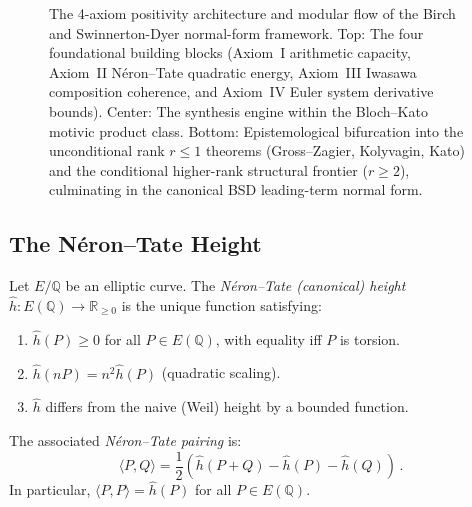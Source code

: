 \documentclass[aps,prd,twocolumn,superscriptaddress,nofootinbib,floatfix]{revtex4-2}
\theoremstyle{definition}
\theoremstyle{remark}
\DeclareMathOperator{\Sha}{Sha}
\begin{document}
\begin{figure}[t]
{%
}
\caption{The 4-axiom positivity architecture and modular flow of the Birch and Swinnerton-Dyer normal-form framework. Top: The four foundational building blocks (Axiom~I arithmetic capacity, Axiom~II Néron--Tate quadratic energy, Axiom~III Iwasawa composition coherence, and Axiom~IV Euler system derivative bounds). Center: The synthesis engine within the Bloch--Kato motivic product class. Bottom: Epistemological bifurcation into the unconditional rank $r \leq 1$ theorems (Gross--Zagier, Kolyvagin, Kato) and the conditional higher-rank structural frontier ($r \geq 2$), culminating in the canonical BSD leading-term normal form.}
\label{fig:bsd_architecture}
\end{figure}

\subsection{The Néron--Tate Height}

Let $E/\mathbb{Q}$ be an elliptic curve. The \textit{Néron--Tate (canonical) height} $\hat{h}: E(\mathbb{Q}) \to \mathbb{R}_{\geq 0}$ is the unique function satisfying:
\begin{enumerate}
\item $\hat{h}(P) \geq 0$ for all $P \in E(\mathbb{Q})$, with equality iff $P$ is torsion.
\item $\hat{h}(nP) = n^2 \hat{h}(P)$ (quadratic scaling).
\item $\hat{h}$ differs from the naive (Weil) height by a bounded function.
\end{enumerate}

The associated \textit{Néron--Tate pairing} is:
\begin{equation}
\langle P, Q \rangle = \frac{1}{2}\left(\hat{h}(P+Q) - \hat{h}(P) - \hat{h}(Q)\right)\,.
\label{eq:NT_pairing}
\end{equation}
In particular, $\langle P, P \rangle = \hat{h}(P)$ for all $P \in E(\mathbb{Q})$.
\end{document}
